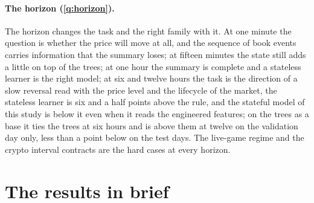 \paragraph{The horizon (\ref{q:horizon}).}  The horizon changes the task and the right
family with it.  At one minute the question is whether the price will move at all, and the
sequence of book events carries information that the summary loses; at fifteen minutes the
state still adds a little on top of the trees; at one hour the summary is complete and a
stateless learner is the right model; at six and
twelve hours the task is the direction of a slow reversal read with the price level and the
lifecycle of the market, the stateless learner is six and a half points above the rule, and the
stateful model of this study is below it even when it reads the engineered features; on the
trees as a base it ties the trees at six hours and is above them at twelve on the validation
day only, less than a point below on the test days.
The live-game regime and the crypto interval contracts are the hard cases at every horizon.

\section{The results in brief}
\label{sec:concl:detail}

